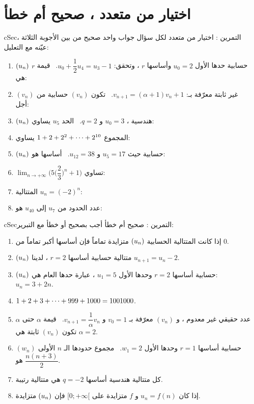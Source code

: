 \documentclass[12pt,a4paper]{article}
\newenvironment{BOX}[2]{\begin{otherlanguage}{english}\begin{arbox}{#1}{#2}}{\end{arbox}\end{otherlanguage}}
\newcounter{exo}
\newenvironment{tamrin}[1]{\stepcounter{exo}\begin{BOX}{cSec}{التمرين \theexo: #1}}{\end{BOX}}
\renewcommand{\cdots}{\mathinner{\cdotp\cdotp\cdotp}}
\newcommand{\limn}{\displaystyle\lim_{n\to+\infty}}
\begin{document}
\section{اختيار من متعدد ، صحيح أم خطأ}
\begin{tamrin}{اختيار من متعدد}
لكل سؤال جواب واحد صحيح من بين الأجوبة الثلاثة ، عيّنه مع التعليل:
\begin{enumerate}
\item $(u_n)$ حسابية حدها الأول $u_0=2$ وأساسها $r$ ، وتحقق: $u_0+\dfrac12u_4=u_3-1$. \ قيمة $r$ هي:
\item $(v_n)$ غير ثابتة معرّفة بـ: $v_{n+1}=(\alpha+1)v_n+1$. \ تكون $(v_n)$ حسابية من أجل:
\item $(u_n)$ هندسية ، $u_0=3$ و $q=2$. \ الحد $u_5$ يساوي:
\item المجموع $1+2+2^2+\cdots+2^{10}$ يساوي:
\item $(u_n)$ حسابية حيث $u_5=17$ و $u_{12}=38$. \ أساسها هو:
\item $\limn\Big(5\Big(\dfrac23\Big)^n+1\Big)$ تساوي:
\item المتتالية $u_n=(-2)^n$:
\item عدد الحدود من $u_7$ إلى $u_{40}$ هو:
\end{enumerate}
\end{tamrin}

\begin{tamrin}{صحيح أم خطأ}
أجب بصحيح أو خطأ مع التبرير:
\begin{enumerate}
\item إذا كانت المتتالية الحسابية $(u_n)$ متزايدة تماماً فإن أساسها أكبر تماماً من $0$.
\item $(u_n)$ متتالية حسابية أساسها $r=2$ ، لدينا $u_{n+1}=u_n-2$.
\item $(u_n)$ حسابية أساسها $r=2$ وحدها الأول $u_1=5$ ، عبارة حدها العام هي: $u_n=3+2n$.
\item $1+2+3+\cdots+999+1000=1001000$.
\item $\alpha$ عدد حقيقي غير معدوم ، و $(v_n)$ معرّفة بـ $v_0=1$ و $v_{n+1}=\dfrac1\alpha v_n$. \ قيمة $\alpha$ حتى تكون $(v_n)$ ثابتة هي $\alpha=2$.
\item $(w_n)$ حسابية أساسها $r=1$ وحدها الأول $w_1=2$. \ مجموع حدودها الـ $n$ الأولى هو $\dfrac{n(n+3)}{2}$.
\item كل متتالية هندسية أساسها $q=-2$ هي متتالية رتيبة.
\item إذا كان $u_n=f(n)$ و $f$ متزايدة على $[0;+\infty[$ فإن $(u_n)$ متزايدة.
\end{enumerate}
\end{tamrin}
\end{document}
